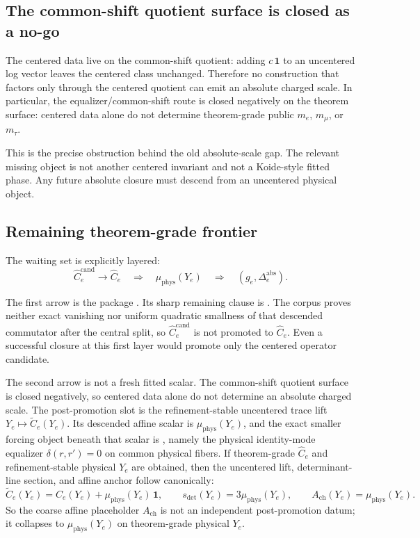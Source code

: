\subsection{The common-shift quotient surface is closed as a no-go}\label{132-zux2083-holonomy-parameterization}

The centered data live on the common-shift quotient: adding \(c\,\mathbf 1\) to an uncentered log vector leaves the centered class unchanged. Therefore no construction that factors only through the centered quotient can emit an absolute charged scale. In particular, the equalizer/common-shift route is closed negatively on the theorem surface: centered data alone do not determine theorem-grade public \(m_e\), \(m_\mu\), or \(m_\tau\).

This is the precise obstruction behind the old absolute-scale gap. The relevant missing object is not another centered invariant and not a Koide-style fitted phase. Any future absolute closure must descend from an uncentered physical object.

\subsection{Remaining theorem-grade frontier}\label{133-why-q--23}

The waiting set is explicitly layered:
\[
\widehat C_e^{\mathrm{cand}}
\longrightarrow
\widehat C_e
\quad\Longrightarrow\quad
\mu_{\mathrm{phys}}(Y_e)
\quad\Longrightarrow\quad
(g_e,\Delta_e^{\mathrm{abs}}).
\]

The first arrow is the package . Its sharp remaining clause is
.
The corpus proves neither exact vanishing nor uniform quadratic smallness of that descended commutator after the central split, so \(\widehat C_e^{\mathrm{cand}}\) is not promoted to \(\widehat C_e\). Even a successful closure at this first layer would promote only the centered operator candidate.

The second arrow is not a fresh fitted scalar. The common-shift quotient surface is closed negatively, so centered data alone do not determine an absolute charged scale. The post-promotion slot is the refinement-stable uncentered trace lift \(Y_e\mapsto \widetilde C_e(Y_e)\). Its descended affine scalar is \(\mu_{\mathrm{phys}}(Y_e)\), and the exact smaller forcing object beneath that scalar is , namely the physical identity-mode equalizer \(\delta(r,r')=0\) on common physical fibers. If theorem-grade \(\widehat C_e\) and refinement-stable physical \(Y_e\) are obtained, then the uncentered lift, determinant-line section, and affine anchor follow canonically:
\[
\widetilde C_e(Y_e)=\widehat C_e(Y_e)+\mu_{\mathrm{phys}}(Y_e)\,\mathbf 1,
\qquad
s_{\det}(Y_e)=3\mu_{\mathrm{phys}}(Y_e),
\qquad
A_{\mathrm{ch}}(Y_e)=\mu_{\mathrm{phys}}(Y_e).
\]
So the coarse affine placeholder \(A_{\mathrm{ch}}\) is not an independent post-promotion datum; it collapses to \(\mu_{\mathrm{phys}}(Y_e)\) on theorem-grade physical \(Y_e\).

